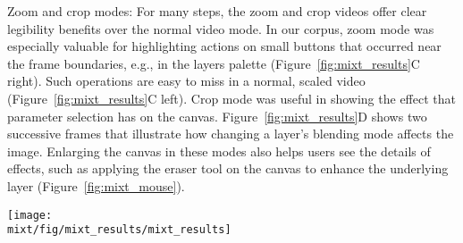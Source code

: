 Zoom and crop modes: For many steps, the zoom and crop videos offer clear legibility benefits over the normal video mode. In our corpus, zoom mode was especially valuable for highlighting actions on small buttons that occurred near the frame boundaries, e.g., in the layers palette (Figure~\ref{fig:mixt_results}C right). Such operations are easy to miss in a normal, scaled video (Figure~\ref{fig:mixt_results}C left). Crop mode was useful in showing the effect that parameter selection has on the canvas. Figure~\ref{fig:mixt_results}D shows two successive frames that illustrate how changing a layer's blending mode affects the image. Enlarging the canvas in these modes also helps users see the details of effects, such as applying the eraser tool on the canvas to enhance the underlying layer (Figure~\ref{fig:mixt_mouse}).

\begin{figure*}[t]
  \centering
  \texttt{[image: \\mixt/fig/mixt\_results/mixt\_results]}
  \caption{Automatically-generated MixT results.}
  \label{fig:mixt_results}
\end{figure*}

